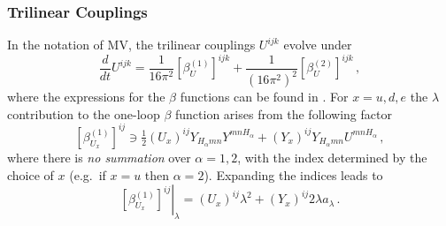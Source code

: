 \documentclass[final,3p,times,pdflatex]{elsarticle}
\newcommand{\dt}{\frac{d}{dt}}
\begin{document}
\subsubsection{Trilinear Couplings}
In the notation of MV, the trilinear couplings $U^{ijk}$ evolve under 
%
\begin{equation}
\dt U^{ijk} = \frac{1}{16\pi^2} \left[\beta_U^{(1)}\right]^{ijk} 
+ \frac{1}{(16\pi^2)^2} \left[\beta_U^{(2)}\right]^{ijk}\,,
\end{equation}
%
where the expressions for the $\beta$ functions can be found in \cite{MV94}.  
For $x = u,d,e$ the $\lambda$ contribution to the one-loop $\beta$ function 
arises from the following factor
%
\begin{equation}
\left[\beta_{U_x}^{(1)}\right]^{ij} \ni \tfrac{1}{2} (U_x)^{ij} 
Y_{H_\alpha mn}Y^{mnH_\alpha} + (Y_x)^{ij} Y_{H_\alpha mn}U^{mnH_\alpha}\,,
\end{equation}
%
where there is {\it no summation} over $\alpha = 1,2$, with the index 
determined by the choice of $x$ (e.g.\ if $x=u$ then $\alpha = 2$). Expanding 
the indices leads to
%
\begin{equation}
\left.\left[\beta_{U_x}^{(1)}\right]^{ij}\right|_\lambda = (U_x)^{ij}\lambda^2 
+ (Y_x)^{ij} 2\lambda a_\lambda\,. \label{eqn: beta hx}
\end{equation}
%
\end{document}
